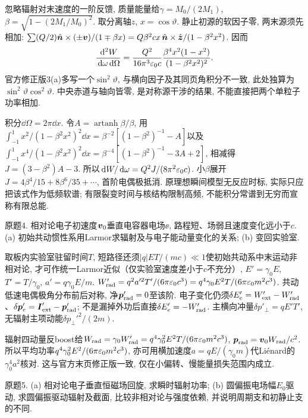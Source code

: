 \begin{solution}
忽略辐射对末速度的一阶反馈, 质量能量给$\gamma=M_0/(2M_1)$, $\beta=\sqrt{1-(2M_1/M_0)^2}$. 取分离轴$z$, $x=\cos\vartheta$. 静止初源的软因子零, 两末源须先相加: $\sum (Q/2)\hat{\boldsymbol{n}}\times(\pm\boldsymbol{v})/(1\mp\beta x)=Q\beta^2cx\,\hat{\boldsymbol{n}}\times\hat{\boldsymbol{z}}/(1-\beta^2x^2)$. 因而
\[
\frac{\,\mathrm d^2W}{\,\mathrm d\omega\,\mathrm d\Omega}=\frac{Q^2}{16\pi^3\varepsilon_0 c}\frac{\beta^4x^2(1-x^2)}{(1-\beta^2x^2)^2}.
\]
官方修正版3(a)多写一个$\sin^2\vartheta$, 与横向因子及其同页角积分不一致, 此处独算为$\sin^2\vartheta\cos^2\vartheta$. 中央赤道与轴向皆零, 是对称源干涉的结果, 不能直接把两个单粒子功率相加.

积分$\dd\Omega=2\pi\dd x$. 令$A=\operatorname{artanh}\beta/\beta$, 用
$\int_{-1}^1x^2/(1-\beta^2x^2)^2\dd x=\beta^{-2}[(1-\beta^2)^{-1}-A]$以及
$\int_{-1}^1x^4/(1-\beta^2x^2)^2\dd x=\beta^{-4}[(1-\beta^2)^{-1}-3A+2]$, 相减得$J=(3-\beta^2)A-3$. 所以$\,\mathrm d W/\,\mathrm d\omega=Q^2J/(8\pi^2\varepsilon_0 c)$. 小$\beta$展开$J=4\beta^4/15+8\beta^6/35+\cdots$, 首阶电偶极抵消. 原理想瞬间模型无反应时标, 实际只应把该式作为低频软谱; 有限裂变时间与核结构限制高频, 不能积分常谱到无穷而宣称有限总能.
\end{solution}
\begin{exercise}
原题4. 相对论电子初速度$\boldsymbol{v}_0$垂直电容器电场$\ee$, 路程短、场弱且速度变化远小于$c$. (a) 初始共动惯性系用Larmor求辐射及与电子能动量变化的关系; (b) 变回实验室.
\end{exercise}
\begin{solution}
取板内实验室驻留时间$T$, 短路径还须$|q|ET/(mc)\ll1$使初始共动系中末运动非相对论, 才可作统一Larmor近似（仅实验室速度差小于$c$不充分）, $E'=\gamma_0E$, $T'=T/\gamma_0$, $a'=q\gamma_0E/m$. $W'_{\rm rad}=q^2a'^2T'/(6\pi\varepsilon_0 c^3)=q^4\gamma_0E^2T/(6\pi\varepsilon_0 m^2c^3)$. 共动低速电偶极角分布前后对称, 净$\boldsymbol{p}'_{\rm rad}=0$至该阶. 电子变化仍须$\delta E'_e=W'_{\rm ext}-W'_{\rm rad}$、$\delta\boldsymbol{p}'_e=\boldsymbol{I}'_{\rm ext}-\boldsymbol{p}'_{\rm rad}$; 不是漏掉外功后直接$\delta E'_e=-W'_{\rm rad}$. 主横向冲量$\delta p'_\perp=qE'T'$, 无辐射主项动能$\delta p_\perp'^2/(2m)$.

辐射四动量反boost给$W_{\rm rad}=\gamma_0W'_{\rm rad}=q^4\gamma_0^2E^2T/(6\pi\varepsilon_0 m^2c^3)$, $\boldsymbol{p}_{\rm rad}=\boldsymbol{v}_0W_{\rm rad}/c^2$. 所以平均功率$q^4\gamma_0^2E^2/(6\pi\varepsilon_0 m^2c^3)$, 亦可用横加速度$a=qE/(\gamma_0m)$代Liénard的$\gamma_0^4a^2$核对. 这与官方末页修正版一致, 仅在小偏转、慢能量损失范围内成立.
\end{solution}
\begin{exercise}
原题5. (a) 相对论电子垂直恒磁场回旋, 求瞬时辐射功率; (b) 圆偏振电场幅$E_0$驱动, 求圆偏振驱动辐射及截面, 比较非相对论与强度依赖, 并说明周期支和初静止支的不同.
\end{exercise}
